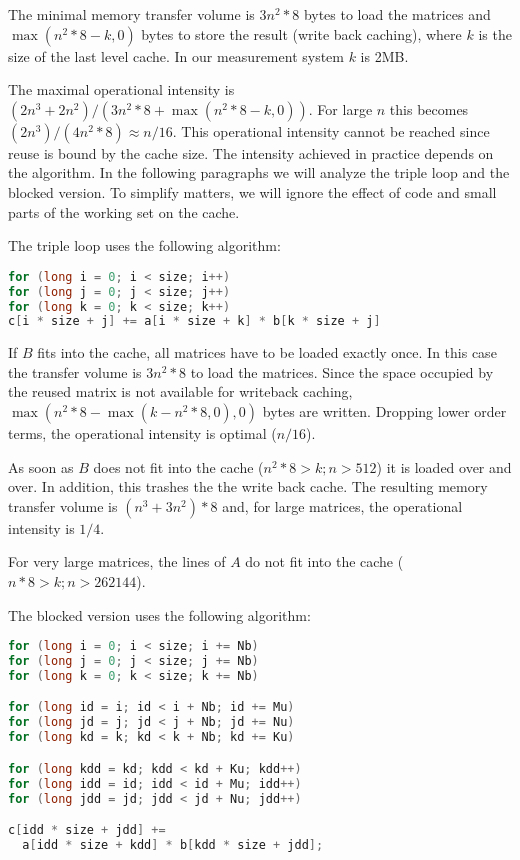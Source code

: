 \documentclass[a4paper,12pt]{article}
\begin{document}
The minimal memory transfer volume is $3n^2*8$ bytes to load the matrices and
$\max(n^2*8-k,0)$ bytes to store the result (write back caching), where $k$ is
the size of the last level cache. In our measurement system $k$ is 2MB.

The maximal operational intensity is $(2n^3+2n^2)/(3n^2*8+\max(n^2*8-k,0))$.
For large $n$ this becomes $(2n^3)/(4n^2*8)\approx n/16$.
This operational intensity cannot be reached since reuse is bound by the cache
size. The intensity achieved in practice depends on the algorithm. In the
following paragraphs we will analyze the triple loop and the blocked version.
To simplify matters, we will ignore the effect of code and small parts of
the working set on the cache.

The triple loop uses the following algorithm:

\begin{lstlisting}[language=C] 
for (long i = 0; i < size; i++) 
for (long j = 0; j < size; j++) 
for (long k = 0; k < size; k++) 
c[i * size + j] += a[i * size + k] * b[k * size + j]
\end{lstlisting}

If $B$ fits into the cache, all matrices have to be loaded exactly once. In this
case the transfer volume is $3n^2*8$ to load the matrices. Since the space
occupied by the reused matrix is not available for writeback caching,
$\max(n^2*8-\max(k-n^2*8,0),0)$ bytes are written. Dropping lower order terms,
the operational intensity is optimal ($n/16$). 

As soon as $B$ does not fit into the cache ($n^2*8>k;n>512$) it is loaded over
and over. In addition, this trashes the the write back cache. The resulting
memory transfer volume is $(n^3+3n^2)*8$ and, for large matrices, the
operational intensity is $1/4$.

For very large matrices, the lines of $A$ do not fit into the cache 
($n*8>k;n>262144$). 
 
The blocked version uses the following algorithm:

\begin{lstlisting}[language=C] 
for (long i = 0; i < size; i += Nb)
for (long j = 0; j < size; j += Nb)
for (long k = 0; k < size; k += Nb)

for (long id = i; id < i + Nb; id += Mu)
for (long jd = j; jd < j + Nb; jd += Nu)
for (long kd = k; kd < k + Nb; kd += Ku)

for (long kdd = kd; kdd < kd + Ku; kdd++)
for (long idd = id; idd < id + Mu; idd++)
for (long jdd = jd; jdd < jd + Nu; jdd++)

c[idd * size + jdd] += 
  a[idd * size + kdd] * b[kdd * size + jdd];
\end{lstlisting}
\end{document}
